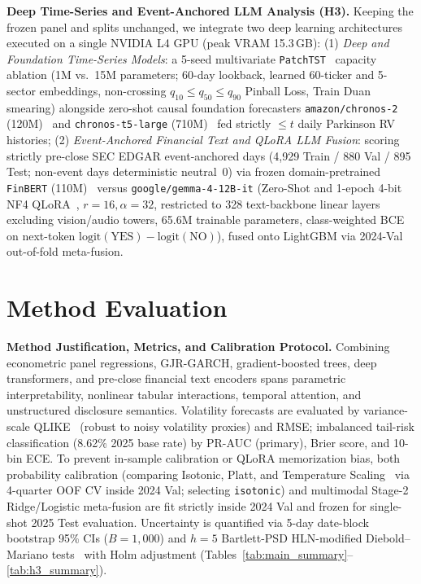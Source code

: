 \documentclass[11pt,a4paper]{article}
\begin{document}
\textbf{Deep Time-Series and Event-Anchored LLM Analysis (H3).} Keeping the
frozen panel and splits unchanged, we integrate two deep learning architectures
executed on a single NVIDIA L4 GPU (peak VRAM 15.3\,GB):
(1) \emph{Deep and Foundation Time-Series Models}: a 5-seed multivariate
\texttt{PatchTST}~\cite{nie2023patchtst} capacity ablation (1M vs.\ 15M
parameters; 60-day lookback, learned 60-ticker and 5-sector embeddings,
non-crossing $q_{10}\le q_{50}\le q_{90}$ Pinball Loss, Train Duan
smearing) alongside zero-shot causal foundation forecasters
\texttt{amazon/chronos-2} (120M)~\cite{ansari2025chronos2} and
\texttt{chronos-t5-large} (710M)~\cite{ansari2024chronos} fed strictly
$\le t$ daily Parkinson RV histories;
(2) \emph{Event-Anchored Financial Text and QLoRA LLM Fusion}: scoring
strictly pre-close SEC EDGAR event-anchored days (4,929 Train / 880 Val /
895 Test; non-event days deterministic neutral~0) via frozen
domain-pretrained \texttt{FinBERT} (110M)~\cite{araci2019finbert} versus
\texttt{google/gemma-4-12B-it} (Zero-Shot and 1-epoch 4-bit NF4
QLoRA~\cite{dettmers2023qlora}, $r=16, \alpha=32$, restricted to 328
text-backbone linear layers excluding vision/audio towers, 65.6M trainable
parameters, class-weighted BCE on next-token $\text{logit}(\text{YES}) -
\text{logit}(\text{NO})$), fused onto LightGBM via 2024-Val out-of-fold
meta-fusion.

\section{Method Evaluation}

\textbf{Method Justification, Metrics, and Calibration Protocol.} Combining
econometric panel regressions, GJR-GARCH, gradient-boosted trees, deep
transformers, and pre-close financial text encoders spans parametric
interpretability, nonlinear tabular interactions, temporal attention, and
unstructured disclosure semantics. Volatility forecasts are evaluated by
variance-scale QLIKE~\cite{patton2011} (robust to noisy volatility proxies)
and RMSE; imbalanced tail-risk classification (8.62\% 2025 base rate) by
PR-AUC (primary), Brier score, and 10-bin ECE. To prevent in-sample calibration
or QLoRA memorization bias, both probability calibration (comparing Isotonic,
Platt, and Temperature Scaling~\cite{guo2017calibration} via 4-quarter OOF CV
inside 2024 Val; selecting \texttt{isotonic}) and multimodal Stage-2
Ridge/Logistic meta-fusion are fit strictly inside 2024 Val and frozen for
single-shot 2025 Test evaluation. Uncertainty is quantified via 5-day
date-block bootstrap 95\% CIs ($B=1{,}000$) and $h=5$ Bartlett-PSD
HLN-modified Diebold--Mariano tests~\cite{harvey1997} with Holm adjustment
(Tables~\ref{tab:main_summary}--\ref{tab:h3_summary}).
\end{document}
